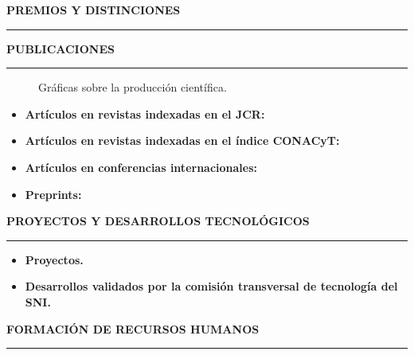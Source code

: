 \documentclass[10pt]{article}
\begin{document}
{\bf PREMIOS Y DISTINCIONES}
\vspace{3pt}
\hrule
 

{\bf PUBLICACIONES}
\vspace{3pt}
\hrule

\begin{figure}[t]
	\hfill
	\caption{Gráficas sobre la producción científica.}
	\label{fig:dummy}
\end{figure}


\begin{itemize}
	\item \textbf{Artículos en revistas indexadas en el JCR:}
	
	
	\item \textbf{Artículos en revistas indexadas en el índice CONACyT:}
	
	
	\item \textbf{Artículos en conferencias internacionales:}
	
	
	\item \textbf{Preprints:}
	
\end{itemize} 

\vspace{0.3cm}
\textbf{PROYECTOS Y DESARROLLOS TECNOLÓGICOS}
\vspace{3pt}
\hrule
\begin{itemize}
	\item \textbf{Proyectos.}
	
	\item \textbf{Desarrollos validados por la comisión transversal de tecnología del SNI.}
	
\end{itemize}


\vspace{0.3cm}
{\bf FORMACIÓN DE RECURSOS HUMANOS}
\vspace{3pt}
\hrule
\end{document}
